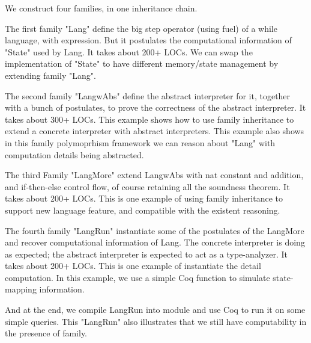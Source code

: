 We construct four families, in one inheritance chain.


The first family "Lang" define the big step operator (using fuel) of a while language, with expression. But it postulates the computational information of "State" used by Lang. It takes about 200+ LOCs. We can swap the implementation of "State" to have different memory/state management by extending family "Lang".

The second family "LangwAbs" define the abstract interpreter for it, together with a bunch of postulates, to prove the correctness of the abstract interpreter. It takes about 300+ LOCs. This example shows how to use family inheritance to extend a concrete interpreter with abstract interpreters. This example also shows in this family polymoprhism framework we can reason about "Lang" with computation details being abstracted. 

The third Family "LangMore" extend LangwAbs with nat constant and addition, and if-then-else control flow, of course retaining all the soundness theorem. It takes about 200+ LOCs. This is one example of using family inheritance to support new language feature, and compatible with the existent reasoning. 

The fourth family "LangRun" instantiate some of the postulates of the LangMore and recover computational information of Lang. The concrete interpreter is doing as expected; the abstract interpreter is expected to act as a type-analyzer. It takes about 200+ LOCs. This is one example of instantiate the detail computation. In this example, we use a simple Coq function to simulate state-mapping information. 

And at the end, we compile LangRun into module and use Coq to run it on some simple queries. This "LangRun" also illustrates that we still have computability in the presence of family. 
